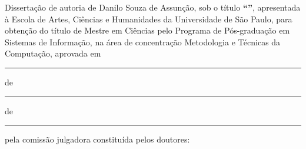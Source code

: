 \documentclass[
	12pt,				%
	oneside,			%
	a4paper,			%
	english,			%
	brazil				%
	]{abntex2ppgsi}
\begin{document}

\begin{folhadeaprovacao}
%
%
%
%
%
\noindent Dissertação de autoria de Danilo Souza de Assunção, sob o título \textbf{``\imprimirtitulo''}, apresentada à Escola de Artes, Ciências e Humanidades da Universidade de São Paulo, para obtenção do título de Mestre em Ciências pelo Programa de Pós-graduação em Sistemas de Informação, na área de concentração Metodologia e Técnicas da Computação, aprovada em \rule{0.85cm}{0.5pt} de \rule{3.5cm}{0.5pt} de \rule{1.25cm}{0.5pt} pela comissão julgadora constituída pelos doutores:

\vspace*{3cm}

\begin{center}
%
% 
% 
% 
% 
%
%
%


\end{center}
\end{folhadeaprovacao}
\end{document}
